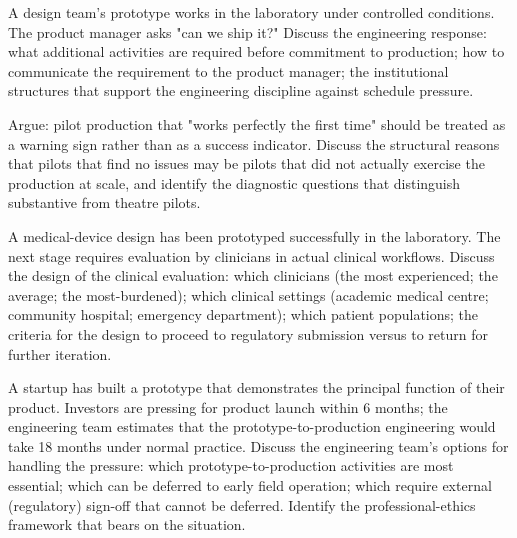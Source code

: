 \begin{exercise}
A design team's prototype works in the laboratory under controlled conditions. The product manager asks "can we ship it?" Discuss the engineering response: what additional activities are required before commitment to production; how to communicate the requirement to the product manager; the institutional structures that support the engineering discipline against schedule pressure.
\end{exercise}

\begin{exercise}
Argue: pilot production that "works perfectly the first time" should be treated as a warning sign rather than as a success indicator. Discuss the structural reasons that pilots that find no issues may be pilots that did not actually exercise the production at scale, and identify the diagnostic questions that distinguish substantive from theatre pilots.
\end{exercise}

\begin{exercise}
A medical-device design has been prototyped successfully in the laboratory. The next stage requires evaluation by clinicians in actual clinical workflows. Discuss the design of the clinical evaluation: which clinicians (the most experienced; the average; the most-burdened); which clinical settings (academic medical centre; community hospital; emergency department); which patient populations; the criteria for the design to proceed to regulatory submission versus to return for further iteration.
\end{exercise}

\begin{exercise}
A startup has built a prototype that demonstrates the principal function of their product. Investors are pressing for product launch within 6 months; the engineering team estimates that the prototype-to-production engineering would take 18 months under normal practice. Discuss the engineering team's options for handling the pressure: which prototype-to-production activities are most essential; which can be deferred to early field operation; which require external (regulatory) sign-off that cannot be deferred. Identify the professional-ethics framework that bears on the situation.
\end{exercise}
